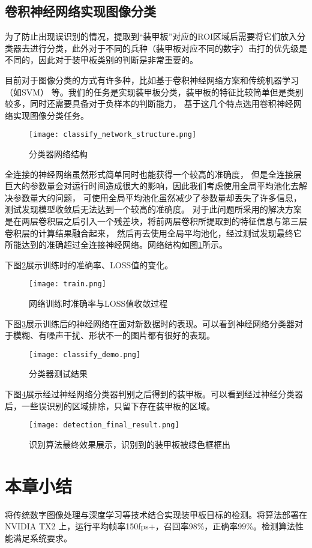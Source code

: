 \subsection{卷积神经网络实现图像分类}

为了防止出现误识别的情况，提取到“装甲板”对应的ROI区域后需要将它们放入分类器去进行分类，此外对于不同的兵种（装甲板对应不同的数字）击打的优先级是不同的，因此对于装甲板类别的判断是非常重要的。\par
目前对于图像分类的方式有许多种，比如基于卷积神经网络方案和传统机器学习（如SVM）
等。我们的任务是实现装甲板分类，装甲板的特征比较简单但是类别较多，同时还需要具备对于负样本的判断能力，
基于这几个特点选用卷积神经网络实现图像分类任务。
\begin{figure}[H]
    \centering
    \texttt{[image: classify\_network\_structure.png]} 
    \caption{分类器网络结构} 
    \label{分类器网络结构}
\end{figure}
全连接的神经网络虽然形式简单同时也能获得一个较高的准确度，
但是全连接层巨大的参数量会对运行时间造成很大的影响，因此我们考虑使用全局平均池化去解决参数量大的问题，
可使用全局平均池化虽然减少了参数量却丢失了许多信息，测试发现模型收敛后无法达到一个较高的准确度。
对于此问题所采用的解决方案是在两层卷积层之后引入一个残差块，将前两层卷积所提取到的特征信息与第三层卷积层的计算结果融合起来，
然后再去使用全局平均池化，经过测试发现最终它所能达到的准确超过全连接神经网络。网络结构如图\ref{分类器网络结构}所示。


下图\ref{网络训练时准确率与LOSS值收敛过程}展示训练时的准确率、LOSS值的变化。
\begin{figure}[H]
    \centering
    \texttt{[image: train.png]} 
    \caption{网络训练时准确率与LOSS值收敛过程} 
    \label{网络训练时准确率与LOSS值收敛过程}
\end{figure}


下图\ref{分类器测试结果}展示训练后的神经网络在面对新数据时的表现。可以看到神经网络分类器对于模糊、有噪声干扰、形状不一的图片都有很好的表现。
\begin{figure}[H]
    \centering
    \texttt{[image: classify\_demo.png]} 
    \caption{分类器测试结果} 
    \label{分类器测试结果}
\end{figure}

下图\ref{识别算法最终效果展示}展示经过神经网络分类器判别之后得到的装甲板。可以看到经过神经分类器后，一些误识别的区域排除，只留下存在装甲板的区域。
\begin{figure}[H]
    \centering
    \texttt{[image: detection\_final\_result.png]} 
    \caption{识别算法最终效果展示，识别到的装甲板被绿色框框出} 
    \label{识别算法最终效果展示}
\end{figure}

\section{本章小结}
将传统数字图像处理与深度学习等技术结合实现装甲板目标的检测。将算法部署在NVIDIA TX2 上，运行平均帧率150fps+，召回率98\%，正确率99\%。检测算法性能满足系统要求。



